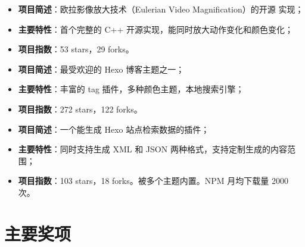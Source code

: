 %
  {
\begin{itemize}
\item \textbf{项目简述}：欧拉影像放大技术（Eulerian Video Magnification）的开源
  实现；
\item \textbf{主要特性}：首个完整的 C++ 开源实现，能同时放大动作变化和颜色变化；
\item \textbf{项目指数}：53 stars，29 forks。
\end{itemize}}

%
{
\begin{itemize}
\item \textbf{项目简述}：最受欢迎的 Hexo 博客主题之一；
\item \textbf{主要特性}：丰富的 tag 插件，多种颜色主题，本地搜索引擎；
\item \textbf{项目指数}：272 stars，122 forks。
\end{itemize}}

%
  {
\begin{itemize}
\item \textbf{项目简述}：一个能生成 Hexo 站点检索数据的插件；
\item \textbf{主要特性}：同时支持生成 XML 和
  JSON 两种格式，支持定制生成的内容范围；
\item \textbf{项目指数}：103 stars，18 forks。被多个主题内置。NPM 月均下载量 2000 次。
\end{itemize}}

\section{\hei 主要奖项}


